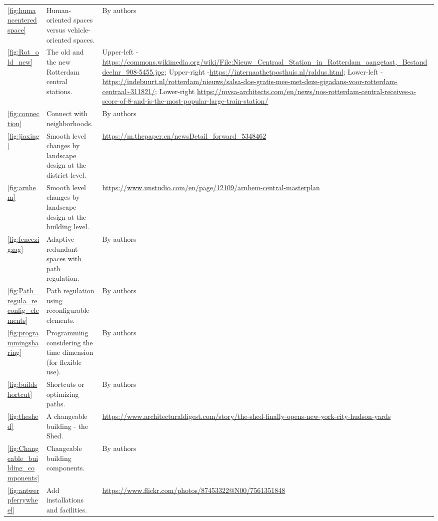\documentclass[]{article}
\begin{document}
\begin{xltabular}{\textwidth}{p{0.01\textwidth} p{0.42\textwidth} p{0.50\textwidth}}
\ref{fig:humancenteredspace} & Human-oriented spaces versus vehicle-oriented spaces. & By authors \\

\ref{fig:Rot_old_new} & The old and the new Rotterdam central stations. & Upper-left - \url{https://commons.wikimedia.org/wiki/File:Nieuw_Centraal_Station_in_Rotterdam_aangetast,_Bestanddeelnr_908-5455.jpg}; Upper-right -\url{https://internaathetposthuis.nl/raldus.html};  Lower-left -\url{https://indebuurt.nl/rotterdam/nieuws/salsa-doe-gratis-mee-met-deze-gigadans-voor-rotterdam-centraal~311821/}; Lower-right \url{https://mvsa-architects.com/en/news/nos-rotterdam-central-receives-a-score-of-8-and-is-the-most-popular-large-train-station/}\\

\ref{fig:connection} & Connect with neighborhoods. & By authors \\

\ref{fig:jiaxing} & Smooth level changes by landscape design at the district level. & \url{https://m.thepaper.cn/newsDetail_forward_5348462} \\

\ref{fig:arnhem} & Smooth level changes by landscape design at the building level. & \url{https://www.unstudio.com/en/page/12109/arnhem-central-masterplan} \\

\ref{fig:fencezigzag} & Adaptive redundant spaces with path regulation. & By authors \\

\ref{fig:Path_regula_reconfig_elements} & Path regulation using reconfigurable elements. & By authors \\

\ref{fig:programmingsharing} & Programming considering the time dimension (for flexible use). & By authors \\

\ref{fig:buildshortcut} & Shortcuts or optimizing paths. & By authors \\

\ref{fig:theshed} & A changeable building - the Shed. & \url{https://www.architecturaldigest.com/story/the-shed-finally-opens-new-york-city-hudson-yards} \\

\ref{fig:Changeable_building_components} & Changeable building components. & By authors \\

\ref{fig:antwerpferrywheel} & Add installations and facilities. & \url{https://www.flickr.com/photos/87453322@N00/7561351848} \\


\end{xltabular}
\end{document}
